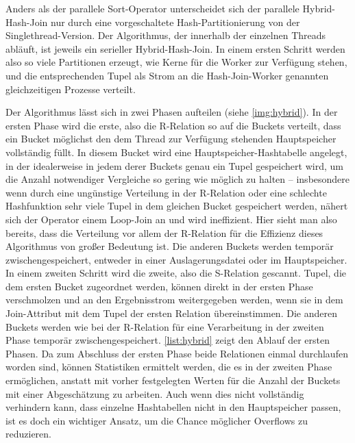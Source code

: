 \documentclass[a4paper,12pt,twoside]{article}
\begin{document}
Anders als der parallele Sort-Operator unterscheidet sich der parallele Hybrid-Hash-Join nur durch eine vorgeschaltete Hash-Partitionierung von der Singlethread-Version. Der Algorithmus, der innerhalb der einzelnen Threads abläuft, ist jeweils ein serieller Hybrid-Hash-Join. In einem ersten Schritt werden also so viele Partitionen erzeugt, wie Kerne für die Worker zur Verfügung stehen, und die entsprechenden Tupel als Strom an die Hash-Join-Worker genannten gleichzeitigen Prozesse verteilt.

Der Algorithmus lässt sich in zwei Phasen aufteilen (siehe \autoref{img:hybrid}). In der ersten Phase wird die erste, also die R-Relation so auf die Buckets verteilt, dass ein Bucket möglichst den dem Thread zur Verfügung stehenden Hauptspeicher vollständig füllt. In diesem Bucket wird eine Hauptspeicher-Hashtabelle angelegt, in der idealerweise in jedem derer Buckets genau ein Tupel gespeichert wird, um die Anzahl notwendiger Vergleiche so gering wie möglich zu halten -- insbesondere wenn durch eine ungünstige Verteilung in der R-Relation oder eine schlechte Hashfunktion sehr viele Tupel in dem gleichen Bucket gespeichert werden, nähert sich der Operator einem Loop-Join an und wird ineffizient. Hier sieht man also bereits, dass die Verteilung vor allem der R-Relation für die Effizienz dieses Algorithmus von großer Bedeutung ist. Die anderen Buckets werden temporär zwischengespeichert, entweder in einer Auslagerungsdatei oder im Hauptspeicher. In einem zweiten Schritt wird die zweite, also die S-Relation gescannt. Tupel, die dem ersten Bucket zugeordnet werden, können direkt in der ersten Phase verschmolzen und an den Ergebnisstrom weitergegeben werden, wenn sie in dem Join-Attribut mit dem Tupel der ersten Relation übereinstimmen. Die anderen Buckets werden wie bei der R-Relation für eine Verarbeitung in der zweiten Phase temporär zwischengespeichert. \autoref{list:hybrid} zeigt den Ablauf der ersten Phasen. Da zum Abschluss der ersten Phase beide Relationen einmal durchlaufen worden sind, können Statistiken ermittelt werden, die es in der zweiten Phase ermöglichen, anstatt mit vorher festgelegten Werten für die Anzahl der Buckets mit einer Abgeschätzung zu arbeiten. Auch wenn dies nicht vollständig verhindern kann, dass einzelne Hashtabellen nicht in den Hauptspeicher passen, ist es doch ein wichtiger Ansatz, um die Chance möglicher Overflows zu reduzieren.   
\end{document}
